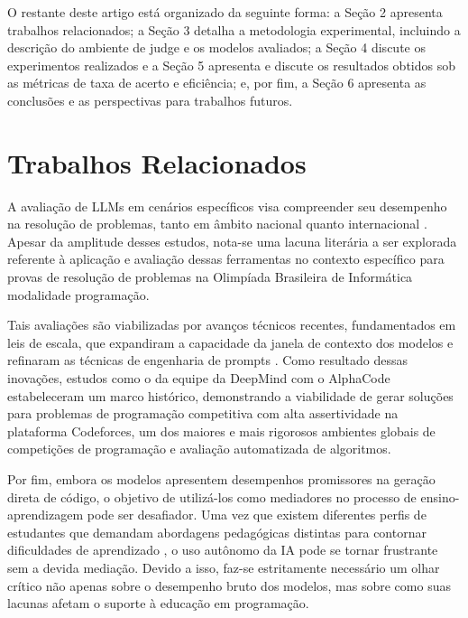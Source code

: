 \documentclass[12pt]{article}
\begin{document}
O restante deste artigo está organizado da seguinte forma: a Seção 2 apresenta trabalhos relacionados; a Seção 3 detalha a metodologia experimental, incluindo a descrição do ambiente de judge e os modelos avaliados; a Seção 4 discute os experimentos realizados e a Seção 5 apresenta e discute os resultados obtidos sob as métricas de taxa de acerto e eficiência; e, por fim, a Seção 6 apresenta as conclusões e as perspectivas para trabalhos futuros.

\section{Trabalhos Relacionados}

A avaliação de LLMs em cenários específicos visa compreender seu desempenho na resolução de problemas, tanto em âmbito nacional quanto internacional \cite{chen2021evaluating, mendonca2024evaluating, viegas2025assessing, huang2024competition, zheng2025livecodebench, li2024evaluating, almeida2023bluex}. Apesar da amplitude desses estudos, nota-se uma lacuna literária a ser explorada referente à aplicação e avaliação dessas ferramentas no contexto específico para provas de resolução de problemas na Olimpíada Brasileira de Informática modalidade programação.

Tais avaliações são viabilizadas por avanços técnicos recentes, fundamentados em leis de escala, que expandiram a capacidade da janela de contexto dos modelos e refinaram as técnicas de engenharia de prompts \cite{kaplan2020scaling, touvron2023llama, dair2025prompt, wei2021finetuned, brown2020language}. Como resultado dessas inovações, estudos como o da equipe da DeepMind com o AlphaCode \cite{li2022competition} estabeleceram um marco histórico, demonstrando a viabilidade de gerar soluções para problemas de programação competitiva com alta assertividade na plataforma Codeforces, um dos maiores e mais rigorosos ambientes globais de competições de programação e avaliação automatizada de algoritmos.

Por fim, embora os modelos apresentem desempenhos promissores na geração direta de código, o objetivo de utilizá-los como mediadores no processo de ensino-aprendizagem pode ser desafiador. Uma vez que existem diferentes perfis de estudantes que demandam abordagens pedagógicas distintas para contornar dificuldades de aprendizado \cite{baist2017analysis}, o uso autônomo da IA pode se tornar frustrante sem a devida mediação. Devido a isso, faz-se estritamente necessário um olhar crítico não apenas sobre o desempenho bruto dos modelos, mas sobre como suas lacunas afetam o suporte à educação em programação.
\end{document}
